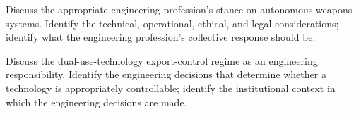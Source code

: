 \begin{exercise}
Discuss the appropriate engineering profession's stance on autonomous-weapons-systems. Identify the technical, operational, ethical, and legal considerations; identify what the engineering profession's collective response should be.
\end{exercise}

\begin{exercise}
Discuss the dual-use-technology export-control regime as an engineering responsibility. Identify the engineering decisions that determine whether a technology is appropriately controllable; identify the institutional context in which the engineering decisions are made.
\end{exercise}

